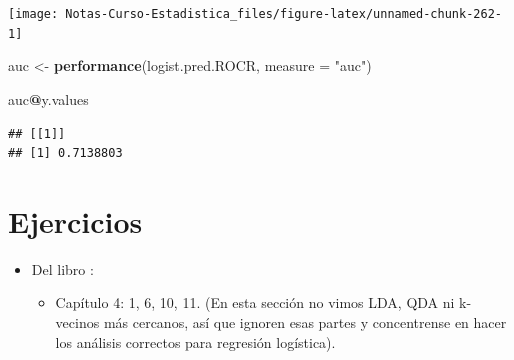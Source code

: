 \documentclass[
  12pt,
]{book}
\newenvironment{Shaded}{\begin{snugshade}}{\end{snugshade}}
\newcommand{\DataTypeTok}[1]{\textcolor[rgb]{0.13,0.29,0.53}{#1}}
\newcommand{\DecValTok}[1]{\textcolor[rgb]{0.00,0.00,0.81}{#1}}
\newcommand{\KeywordTok}[1]{\textcolor[rgb]{0.13,0.29,0.53}{\textbf{#1}}}
\newcommand{\NormalTok}[1]{#1}
\newcommand{\OperatorTok}[1]{\textcolor[rgb]{0.81,0.36,0.00}{\textbf{#1}}}
\newcommand{\StringTok}[1]{\textcolor[rgb]{0.31,0.60,0.02}{#1}}
\providecommand{\tightlist}{%
  \setlength{\itemsep}{0pt}\setlength{\parskip}{0pt}}
\theoremstyle{definition}
\theoremstyle{definition}
\theoremstyle{definition}
\theoremstyle{remark}
\begin{document}
\begin{Shaded}
\end{Shaded}

\begin{center}\texttt{[image: Notas-Curso-Estadistica\_files/figure-latex/unnamed-chunk-262-1]} \end{center}

\begin{Shaded}
\begin{Highlighting}[]
\NormalTok{auc <-}\StringTok{ }\KeywordTok{performance}\NormalTok{(logist.pred.ROCR, }\DataTypeTok{measure =} \StringTok{"auc"}\NormalTok{)}

\NormalTok{auc}\OperatorTok{@}\NormalTok{y.values}
\end{Highlighting}
\end{Shaded}

\begin{verbatim}
## [[1]]
## [1] 0.7138803
\end{verbatim}

\hypertarget{ejercicios-4}{%
\section{Ejercicios}\label{ejercicios-4}}

\begin{itemize}
\tightlist
\item
  Del libro \autocite{James2013b}:

  \begin{itemize}
  \tightlist
  \item
    Capítulo 4: 1, 6, 10, 11. (En esta sección no vimos LDA, QDA ni k-vecinos más cercanos, así que ignoren esas partes y concentrense en hacer los análisis correctos para regresión logística).
  \end{itemize}
\end{itemize}
\end{document}
